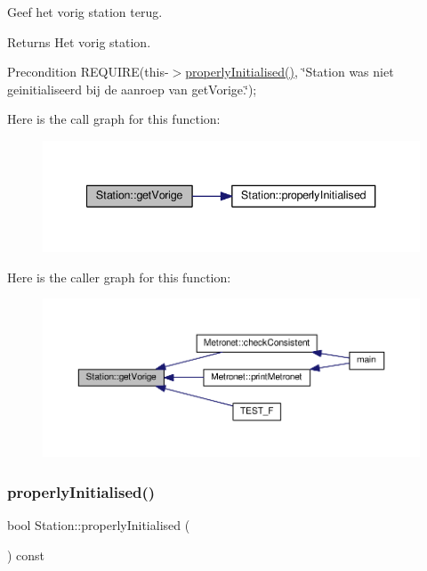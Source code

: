 Geef het vorig station terug. 

\begin{DoxyReturn}{Returns}
Het vorig station. 
\end{DoxyReturn}
\begin{DoxyPrecond}{Precondition}
R\+E\+Q\+U\+I\+RE(this-\/$>$\hyperlink{class_station_a9ce626dd0599e3ea8107404a59c21e16}{properly\+Initialised()}, \char`\"{}\+Station was niet geinitialiseerd bij de aanroep van get\+Vorige.\char`\"{}); 
\end{DoxyPrecond}
Here is the call graph for this function\+:\nopagebreak
\begin{figure}[H]
\begin{center}
\leavevmode
\includegraphics[width=340pt]{class_station_a6776dd16c23da9f512d82883ea896fea_cgraph}
\end{center}
\end{figure}
Here is the caller graph for this function\+:\nopagebreak
\begin{figure}[H]
\begin{center}
\leavevmode
\includegraphics[width=350pt]{class_station_a6776dd16c23da9f512d82883ea896fea_icgraph}
\end{center}
\end{figure}
\mbox{\label{class_station_a9ce626dd0599e3ea8107404a59c21e16}} 
\subsubsection{\texorpdfstring{properly\+Initialised()}{properlyInitialised()}}
{\footnotesize\ttfamily bool Station\+::properly\+Initialised (\begin{DoxyParamCaption}{ }\end{DoxyParamCaption}) const}



